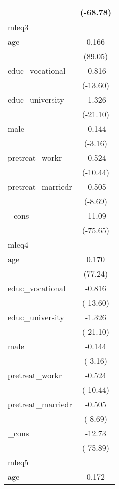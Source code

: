 {\begin{tabular}{l*{1}{c}}
            &    (-68.78)         \\
\hline
mleq3       &                     \\
age         &       0.166\sym{***}\\
            &     (89.05)         \\
[1em]
educ\_vocational&      -0.816\sym{***}\\
            &    (-13.60)         \\
[1em]
educ\_university&      -1.326\sym{***}\\
            &    (-21.10)         \\
[1em]
male        &      -0.144\sym{**} \\
            &     (-3.16)         \\
[1em]
pretreat\_workr&      -0.524\sym{***}\\
            &    (-10.44)         \\
[1em]
pretreat\_marriedr&      -0.505\sym{***}\\
            &     (-8.69)         \\
[1em]
\_cons      &      -11.09\sym{***}\\
            &    (-75.65)         \\
\hline
mleq4       &                     \\
age         &       0.170\sym{***}\\
            &     (77.24)         \\
[1em]
educ\_vocational&      -0.816\sym{***}\\
            &    (-13.60)         \\
[1em]
educ\_university&      -1.326\sym{***}\\
            &    (-21.10)         \\
[1em]
male        &      -0.144\sym{**} \\
            &     (-3.16)         \\
[1em]
pretreat\_workr&      -0.524\sym{***}\\
            &    (-10.44)         \\
[1em]
pretreat\_marriedr&      -0.505\sym{***}\\
            &     (-8.69)         \\
[1em]
\_cons      &      -12.73\sym{***}\\
            &    (-75.89)         \\
\hline
mleq5       &                     \\
age         &       0.172\sym{***}\\

\end{tabular}}
